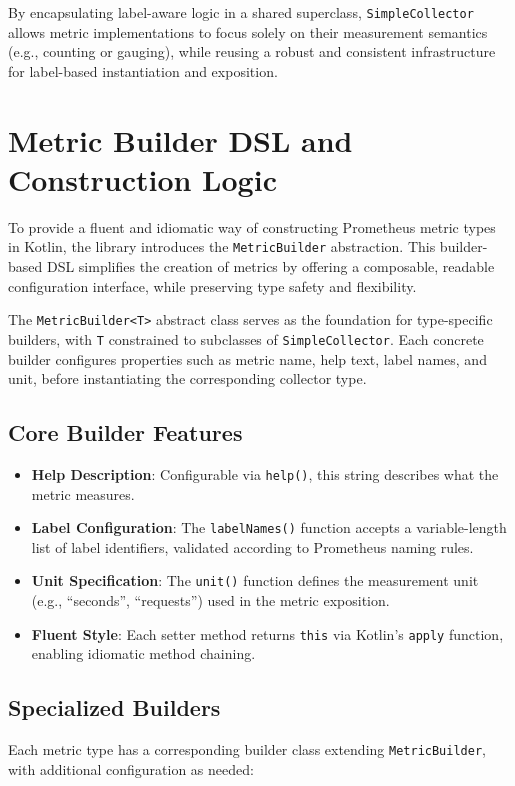 By encapsulating label-aware logic in a shared superclass, \texttt{SimpleCollector} allows metric implementations to focus solely on their measurement semantics (e.g., counting or gauging), while reusing a robust and consistent infrastructure for label-based instantiation and exposition.

\section{Metric Builder DSL and Construction Logic}

To provide a fluent and idiomatic way of constructing Prometheus metric types in Kotlin, the library introduces the \texttt{MetricBuilder} abstraction. This builder-based DSL simplifies the creation of metrics by offering a composable, readable configuration interface, while preserving type safety and flexibility.

The \texttt{MetricBuilder<T>} abstract class serves as the foundation for type-specific builders, with \texttt{T} constrained to subclasses of \texttt{SimpleCollector}. Each concrete builder configures properties such as metric name, help text, label names, and unit, before instantiating the corresponding collector type.

\subsection*{Core Builder Features}
\begin{itemize}
    \item \textbf{Help Description}: Configurable via \texttt{help()}, this string describes what the metric measures.
    
    \item \textbf{Label Configuration}: The \texttt{labelNames()} function accepts a variable-length list of label identifiers, validated according to Prometheus naming rules.
    
    \item \textbf{Unit Specification}: The \texttt{unit()} function defines the measurement unit (e.g., ``seconds'', ``requests'') used in the metric exposition.
    
    \item \textbf{Fluent Style}: Each setter method returns \texttt{this} via Kotlin’s \texttt{apply} function, enabling idiomatic method chaining.
\end{itemize}

\subsection*{Specialized Builders}
Each metric type has a corresponding builder class extending \texttt{MetricBuilder}, with additional configuration as needed:

